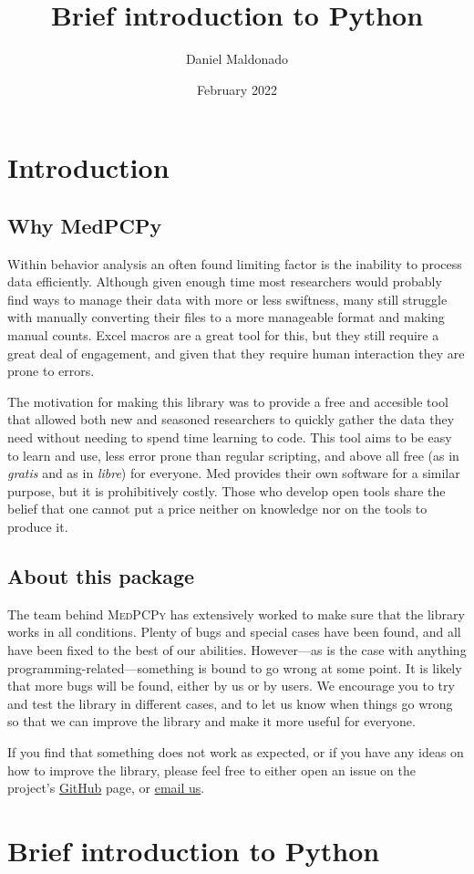 \documentclass[a4paper,12pt]{article}
\title{Brief introduction to Python}
\author{Daniel Maldonado}
\date{February 2022}
\begin{document}
{\scshape\bfseries \maketitle}

\tableofcontents

\newpage
\section{Introduction}

\subsection{Why MedPCPy}

Within behavior analysis an often found limiting factor is the inability to process data efficiently. Although given enough time most researchers would probably find ways to manage their data with more or less swiftness, many still struggle with manually converting their files to a more manageable format and making manual counts. Excel macros are a great tool for this, but they still require a great deal of engagement, and given that they require human interaction they are prone to errors.

The motivation for making this library was to provide a free and accesible tool that allowed both new and seasoned researchers to quickly gather the data they need without needing to spend time learning to code. This tool aims to be easy to learn and use, less error prone than regular scripting, and above all free (as in {\slshape gratis} and as in {\slshape libre}) for everyone. Med provides their own software for a similar purpose, but it is prohibitively costly. Those who develop open tools share the belief that one cannot put a price neither on knowledge nor on the tools to produce it.

\subsection{About this package}

The team behind {\scshape MedPCPy} has extensively worked to make sure that the library works in all conditions. Plenty of bugs and special cases have been found, and all have been fixed to the best of our abilities. However---as is the case with anything programming-related---something is bound to go wrong at some point. It is likely that more bugs will be found, either by us or by users. We encourage you to try and test the library in different cases, and to let us know when things go wrong so that we can improve the library and make it more useful for everyone.

If you find that something does not work as expected, or if you have any ideas on how to improve the library, please feel free to either open an issue on the project's \href{https://github.com/JuodaanViinaa/Laboratorio}{GitHub} page, or \href{mailto:maldonadodaniel96@outlook.com}{email us}.

\newpage
\section{Brief introduction to Python}
\end{document}
